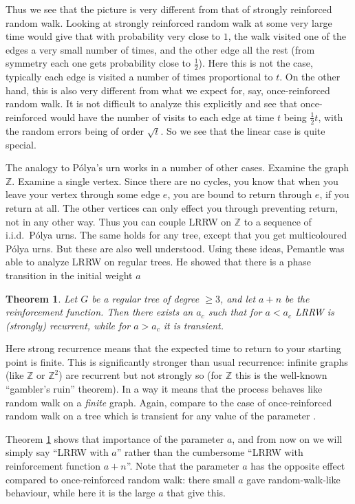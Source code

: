 \documentclass{emsprocart}
\theoremstyle{plain}
\newtheorem{thm}{Theorem}
\begin{document}
Thus we see that the picture is very different from that of strongly
reinforced random walk. Looking at strongly reinforced random
walk at some very large time would give that with probability very
close to $1$, the walk visited one of the edges a very small number
of times, and the other edge all the rest (from symmetry each one gets
probability close to $\frac{1}{2}$). Here this is not the case, typically
each edge is visited a number of times proportional to $t$. On the
other hand, this is also very different from what we expect for, say,
once-reinforced random walk. It is not difficult to analyze this explicitly
and see that once-reinforced would have the number of visits to each
edge at time $t$ being $\frac{1}{2}t$, with the random errors being
of order $\sqrt{t}$. So we see that the linear case is quite special.

The analogy to P\'olya's urn works in a number of other cases. Examine
the graph $\mathbb{Z}$. Examine a single vertex. Since there are
no cycles, you know that when you leave your vertex through some edge
$e$, you are bound to return through $e$, if you return at all.
The other vertices can only effect you through preventing return,
not in any other way. Thus you can couple LRRW on $\mathbb{Z}$ to
a sequence of i.i.d.\ P\'olya urns. The same holds for any tree,
except that you get multicoloured P\'olya urns. But these are also
well understood. Using these ideas, Pemantle \cite{P88} was able
to analyze LRRW on regular trees. He showed that there is a phase
transition in the initial weight $a$
\begin{thm}
\label{thm:pmntl}Let $G$ be a regular tree of degree $\ge3$, and
let $a+n$ be the reinforcement function. Then there exists an $a_{c}$
such that for $a<a_{c}$ LRRW is (strongly) recurrent, while for $a>a_{c}$
it is transient.
\end{thm}
Here strong recurrence means that the expected time to return to your
starting point is finite. This is significantly stronger than usual
recurrence: infinite graphs (like $\mathbb{Z}$ or $\mathbb{Z}^{2}$)
are recurrent but not strongly so (for $\mathbb{Z}$ this is the well-known
``gambler's ruin'' theorem). In a way it means that the process
behaves like random walk on a \emph{finite} graph. Again, compare
to the case of once-reinforced random walk on a tree which is transient
for any value of the parameter \cite{DKL02}.

Theorem \ref{thm:pmntl} shows that importance of the parameter $a$,
and from now on we will simply say ``LRRW with $a$'' rather than
the cumbersome ``LRRW with reinforcement function $a+n$''. Note that
the parameter $a$ has the opposite effect compared to once-reinforced
random walk: there small $a$ gave random-walk-like behaviour, while
here it is the large $a$ that give this.
\end{document}
